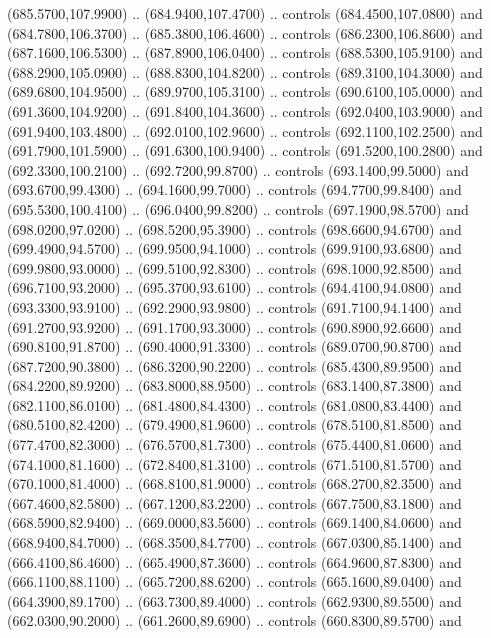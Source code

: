 {\begin{scope}[y=0.80pt, x=0.80pt, yscale=-1, xscale=1, inner sep=0pt, outer sep=0pt, #1]
      (685.5700,107.9900) .. (684.9400,107.4700) .. controls (684.4500,107.0800) and
      (684.7800,106.3700) .. (685.3800,106.4600) .. controls (686.2300,106.8600) and
      (687.1600,106.5300) .. (687.8900,106.0400) .. controls (688.5300,105.9100) and
      (688.2900,105.0900) .. (688.8300,104.8200) .. controls (689.3100,104.3000) and
      (689.6800,104.9500) .. (689.9700,105.3100) .. controls (690.6100,105.0000) and
      (691.3600,104.9200) .. (691.8400,104.3600) .. controls (692.0400,103.9000) and
      (691.9400,103.4800) .. (692.0100,102.9600) .. controls (692.1100,102.2500) and
      (691.7900,101.5900) .. (691.6300,100.9400) .. controls (691.5200,100.2800) and
      (692.3300,100.2100) .. (692.7200,99.8700) .. controls (693.1400,99.5000) and
      (693.6700,99.4300) .. (694.1600,99.7000) .. controls (694.7700,99.8400) and
      (695.5300,100.4100) .. (696.0400,99.8200) .. controls (697.1900,98.5700) and
      (698.0200,97.0200) .. (698.5200,95.3900) .. controls (698.6600,94.6700) and
      (699.4900,94.5700) .. (699.9500,94.1000) .. controls (699.9100,93.6800) and
      (699.9800,93.0000) .. (699.5100,92.8300) .. controls (698.1000,92.8500) and
      (696.7100,93.2000) .. (695.3700,93.6100) .. controls (694.4100,94.0800) and
      (693.3300,93.9100) .. (692.2900,93.9800) .. controls (691.7100,94.1400) and
      (691.2700,93.9200) .. (691.1700,93.3000) .. controls (690.8900,92.6600) and
      (690.8100,91.8700) .. (690.4000,91.3300) .. controls (689.0700,90.8700) and
      (687.7200,90.3800) .. (686.3200,90.2200) .. controls (685.4300,89.9500) and
      (684.2200,89.9200) .. (683.8000,88.9500) .. controls (683.1400,87.3800) and
      (682.1100,86.0100) .. (681.4800,84.4300) .. controls (681.0800,83.4400) and
      (680.5100,82.4200) .. (679.4900,81.9600) .. controls (678.5100,81.8500) and
      (677.4700,82.3000) .. (676.5700,81.7300) .. controls (675.4400,81.0600) and
      (674.1000,81.1600) .. (672.8400,81.3100) .. controls (671.5100,81.5700) and
      (670.1000,81.4000) .. (668.8100,81.9000) .. controls (668.2700,82.3500) and
      (667.4600,82.5800) .. (667.1200,83.2200) .. controls (667.7500,83.1800) and
      (668.5900,82.9400) .. (669.0000,83.5600) .. controls (669.1400,84.0600) and
      (668.9400,84.7000) .. (668.3500,84.7700) .. controls (667.0300,85.1400) and
      (666.4100,86.4600) .. (665.4900,87.3600) .. controls (664.9600,87.8300) and
      (666.1100,88.1100) .. (665.7200,88.6200) .. controls (665.1600,89.0400) and
      (664.3900,89.1700) .. (663.7300,89.4000) .. controls (662.9300,89.5500) and
      (662.0300,90.2000) .. (661.2600,89.6900) .. controls (660.8300,89.5700) and

\end{scope}}
